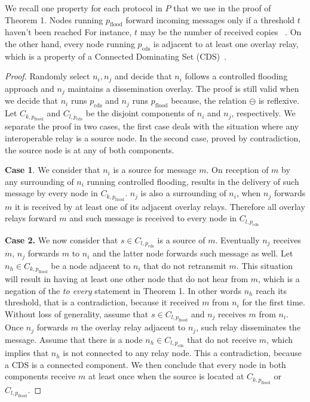 %
We recall one property for each protocol in $P$ that we use in the proof of Theorem 1.
%
Nodes running $p_{\text{flood}}$ forward incoming messages only if a threshold $t$ haven't been reached
%
For instance, $t$ may be the number of received copies ~\cite{BroadcastStormProblem}.
%
On the other hand, every node running $p_{\text{cds}}$ is adjacent to at least one overlay relay, which is a property of a Connected Dominating Set (CDS)~\cite{cds-explained}.
%
\begin{proof}
Randomly select $ n_{i}, n_{j} $ and decide that $n_i$ follows a controlled flooding approach and $n_j$ maintains a dissemination overlay.
%
The proof is still valid when we decide that $n_i$ runs $p_{\text{cds}}$ and $n_j$ runs $p_{\text{flood}}$ because, the relation $\ominus$ is reflexive.
%
Let $ C_{k, p_{\text{flood}}} $ and $ C_{l, p_{\text{cds}}} $ be the disjoint components of $n_i$ and  $n_j$, respectively.
%
We separate the proof in two cases, the first case deals with the situation where any interoperable relay is a source node.
%
In the second case, proved by contradiction, the source node is at any of both components.

%
\textbf{Case 1}. We consider that $n_i$ is a source for message $m$.
%
On reception of $m$ by any surrounding of $n_i$ running controlled flooding, results in the delivery of such message by every node in $ C_{k, p_{\text{flood}}} $.
%
$n_j$ is also a surrounding of $n_i$, when $n_j$ forwards $m$ it is received by at least one of its adjacent overlay relays.
%
Therefore all overlay relays forward $m$ and such message is received to every node in $ C_{l, p_{\text{cds}}} $
%

%
\textbf{Case 2.} We now consider that $ s \in C_{l, p_{\text{cds}}} $ is a source of $m$.
%
Eventually $n_{j}$ receives $m$, $n_{j}$ forwards $m$ to $n_{i}$ and the latter node forwards such message as well.
%
Let $n_{h} \in C_{k, p_{\text{flood}}} $ be a node adjacent to $n_{i}$ that do not retransmit $m$.
%
This situation will result in having at least one other node that do not hear from $m$, which is a negation of the \emph{to every} statement in Theorem 1.
%
%
In other words $n_{h}$ reach its threshold, that is a contradiction, because it received $m$ from $n_i$ for the first time.
%
Without loss of generality, assume that $ s \in C_{l, p_{\text{flood}}} $ and $n_j$ receives $m$ from $n_i$.
%
Once $n_j$ forwards $m$ the overlay relay adjacent to $n_j$, such relay disseminates the message.
%
Assume that there is a node $n_{h} \in C_{l, p_{\text{cds}}} $ that do not receive $m$, which implies that $n_h$ is not connected to any relay node.
%
This a contradiction, because a CDS is a connected component.
%
We then conclude that every node in both components receive $m$ at least once when the source is located at $ C_{k, p_{\text{flood}}} $ or $ C_{l, p_{\text{flood}}}$.
\end{proof}

